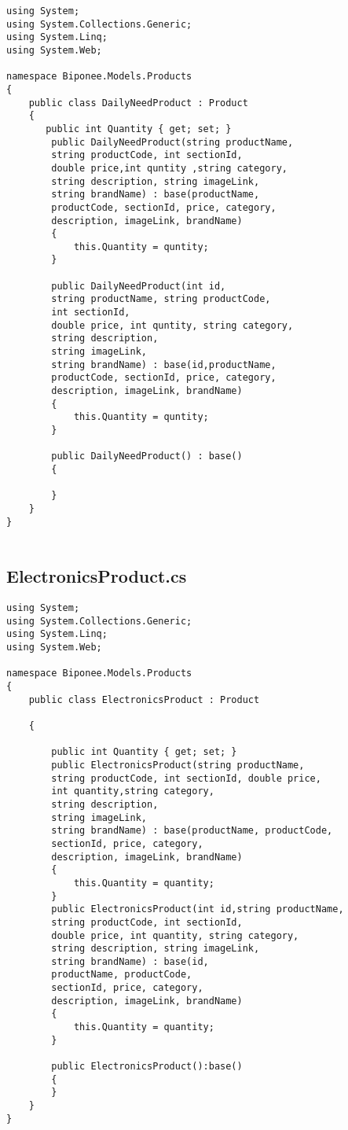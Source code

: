 \begin{lstlisting}
using System;
using System.Collections.Generic;
using System.Linq;
using System.Web;

namespace Biponee.Models.Products
{
    public class DailyNeedProduct : Product
    {
       public int Quantity { get; set; }
        public DailyNeedProduct(string productName, 
        string productCode, int sectionId,
        double price,int quntity ,string category, 
        string description, string imageLink, 
        string brandName) : base(productName, 
        productCode, sectionId, price, category, 
        description, imageLink, brandName)
        {
            this.Quantity = quntity;
        }

        public DailyNeedProduct(int id,
        string productName, string productCode, 
        int sectionId, 
        double price, int quntity, string category, 
        string description, 
        string imageLink, 
        string brandName) : base(id,productName, 
        productCode, sectionId, price, category, 
        description, imageLink, brandName)
        {
            this.Quantity = quntity;
        }

        public DailyNeedProduct() : base()
        {

        }
    }
}


\end{lstlisting}

\newpage

\subsection{ElectronicsProduct.cs}
\begin{lstlisting}
using System;
using System.Collections.Generic;
using System.Linq;
using System.Web;

namespace Biponee.Models.Products
{
    public class ElectronicsProduct : Product

    {

        public int Quantity { get; set; }
        public ElectronicsProduct(string productName, 
        string productCode, int sectionId, double price, 
        int quantity,string category,
        string description,
        string imageLink,
        string brandName) : base(productName, productCode,
        sectionId, price, category,
        description, imageLink, brandName)
        {
            this.Quantity = quantity;
        }
        public ElectronicsProduct(int id,string productName, 
        string productCode, int sectionId,
        double price, int quantity, string category, 
        string description, string imageLink, 
        string brandName) : base(id,
        productName, productCode, 
        sectionId, price, category, 
        description, imageLink, brandName)
        {
            this.Quantity = quantity;
        }

        public ElectronicsProduct():base()
        {
        }
    }
}


\end{lstlisting}

